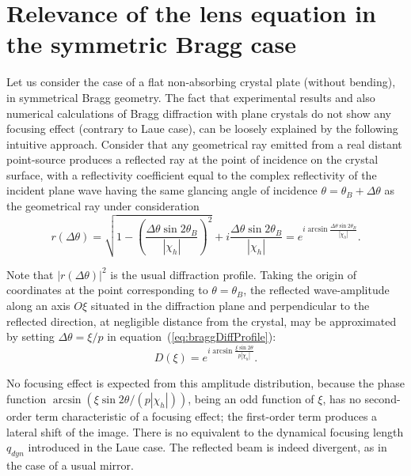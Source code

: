 \documentclass[preprint]{iucr}              %
\begin{document}
\section{Relevance of the lens equation in the symmetric Bragg case}
\label{sec:BraggGeometry}
Let us consider the case of a flat non-absorbing crystal plate (without bending), in symmetrical Bragg geometry. The fact that experimental results and also numerical calculations \cite{Honkanen2018} of Bragg diffraction with plane crystals do not show any focusing effect (contrary to Laue case), can be loosely explained by the following intuitive approach. Consider that any geometrical ray emitted from a real distant point-source produces a reflected ray at the point of incidence on the crystal surface, with a reflectivity coefficient equal to the complex reflectivity of the incident plane wave having the same glancing angle of incidence $\theta=\theta_B+\Delta\theta$ as the geometrical ray under consideration
\begin{equation}
\label{eq:braggDiffProfile}
    r(\Delta\theta) = \sqrt{1-\left(\frac{\Delta\theta\sin2\theta_B}{|\chi_h|}\right)^2} + i \frac{\Delta\theta\sin2\theta_B}{|\chi_h|} =
    e^{i \arcsin{\frac{\Delta\theta \sin2\theta_B}{ |\chi_h|}}}.
\end{equation}

Note that $|r(\Delta\theta)|^2$ is the usual diffraction profile. Taking the origin of coordinates at the point corresponding to $\theta=\theta_B$, the reflected wave-amplitude along an axis $O\xi$ situated in the diffraction plane and perpendicular to the reflected direction, at negligible distance from the crystal, may be approximated by setting  $\Delta\theta=\xi/p$ in equation~(\ref{eq:braggDiffProfile}):
\begin{equation}
    D(\xi) = e^{i \arcsin{\frac{\xi \sin2\theta}{p |\chi_h|}}}.
\end{equation}

No focusing effect is expected from this amplitude distribution, because the phase function $\arcsin(\xi \sin2\theta/ (p |\chi_h|))$, being an odd function of $\xi$, has no second-order term characteristic of a focusing effect; the first-order term produces a lateral shift of the image. There is no equivalent to the dynamical focusing length $q_{dyn}$ introduced in the Laue case. The reflected beam is indeed divergent, as in the case of a usual mirror.
\end{document}
